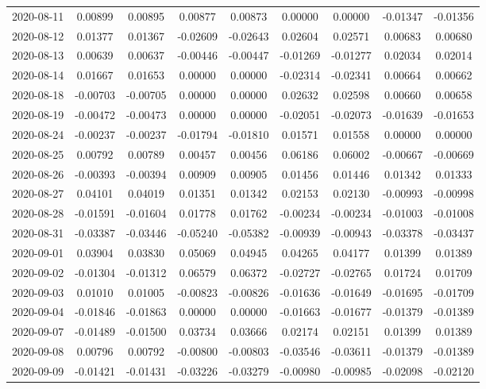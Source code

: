 \begin{footnotesize}
\begin{longtable}{lcccccccc}
2020-08-11 & 0.00899 & 0.00895 & 0.00877 & 0.00873 & 0.00000 & 0.00000 & -0.01347 & -0.01356 \\
2020-08-12 & 0.01377 & 0.01367 & -0.02609 & -0.02643 & 0.02604 & 0.02571 & 0.00683 & 0.00680 \\
2020-08-13 & 0.00639 & 0.00637 & -0.00446 & -0.00447 & -0.01269 & -0.01277 & 0.02034 & 0.02014 \\
2020-08-14 & 0.01667 & 0.01653 & 0.00000 & 0.00000 & -0.02314 & -0.02341 & 0.00664 & 0.00662 \\
2020-08-18 & -0.00703 & -0.00705 & 0.00000 & 0.00000 & 0.02632 & 0.02598 & 0.00660 & 0.00658 \\
2020-08-19 & -0.00472 & -0.00473 & 0.00000 & 0.00000 & -0.02051 & -0.02073 & -0.01639 & -0.01653 \\
2020-08-24 & -0.00237 & -0.00237 & -0.01794 & -0.01810 & 0.01571 & 0.01558 & 0.00000 & 0.00000 \\
2020-08-25 & 0.00792 & 0.00789 & 0.00457 & 0.00456 & 0.06186 & 0.06002 & -0.00667 & -0.00669 \\
2020-08-26 & -0.00393 & -0.00394 & 0.00909 & 0.00905 & 0.01456 & 0.01446 & 0.01342 & 0.01333 \\
2020-08-27 & 0.04101 & 0.04019 & 0.01351 & 0.01342 & 0.02153 & 0.02130 & -0.00993 & -0.00998 \\
2020-08-28 & -0.01591 & -0.01604 & 0.01778 & 0.01762 & -0.00234 & -0.00234 & -0.01003 & -0.01008 \\
2020-08-31 & -0.03387 & -0.03446 & -0.05240 & -0.05382 & -0.00939 & -0.00943 & -0.03378 & -0.03437 \\
2020-09-01 & 0.03904 & 0.03830 & 0.05069 & 0.04945 & 0.04265 & 0.04177 & 0.01399 & 0.01389 \\
2020-09-02 & -0.01304 & -0.01312 & 0.06579 & 0.06372 & -0.02727 & -0.02765 & 0.01724 & 0.01709 \\
2020-09-03 & 0.01010 & 0.01005 & -0.00823 & -0.00826 & -0.01636 & -0.01649 & -0.01695 & -0.01709 \\
2020-09-04 & -0.01846 & -0.01863 & 0.00000 & 0.00000 & -0.01663 & -0.01677 & -0.01379 & -0.01389 \\
2020-09-07 & -0.01489 & -0.01500 & 0.03734 & 0.03666 & 0.02174 & 0.02151 & 0.01399 & 0.01389 \\
2020-09-08 & 0.00796 & 0.00792 & -0.00800 & -0.00803 & -0.03546 & -0.03611 & -0.01379 & -0.01389 \\
2020-09-09 & -0.01421 & -0.01431 & -0.03226 & -0.03279 & -0.00980 & -0.00985 & -0.02098 & -0.02120 \\

\end{longtable}
\end{footnotesize}

